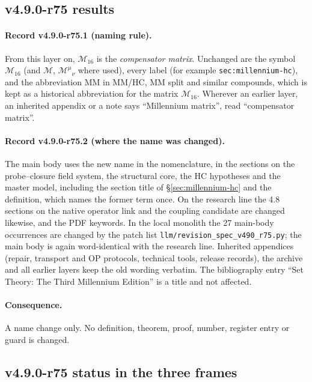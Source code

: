 \subsection*{v4.9.0-r75 results}
\label{subsec:v490-r75-results}

\paragraph{Record v4.9.0-r75.1 (naming rule).}
From this layer on, \(\mathcal M_{16}\) is the \emph{compensator matrix}.  Unchanged are the symbol \(\mathcal M_{16}\) (and
\(\mathcal M\), \(\mathcal M^\mu{}_\nu\) where used), every label (for example \texttt{sec:millennium-hc}), and the
abbreviation MM in MM/HC, MM split and similar compounds, which is kept as a historical abbreviation for the matrix
\(\mathcal M_{16}\).  Wherever an earlier layer, an inherited appendix or a note says ``Millennium matrix'', read
``compensator matrix''.

\paragraph{Record v4.9.0-r75.2 (where the name was changed).}
The main body uses the new name in the nomenclature, in the sections on the probe--closure field system, the structural core,
the HC hypotheses and the master model, including the section title of \S\ref{sec:millennium-hc} and the definition, which
names the former term once.  On the research line the 4.8 sections on the native operator link and the coupling candidate are
changed likewise, and the PDF keywords.  In the local monolith the 27 main-body occurrences are changed by the patch list
\texttt{llm/revision\_spec\_\allowbreak v490\_\allowbreak r75.py}; the main body is again word-identical with the research
line.  Inherited appendices (repair, transport and OP protocols, technical tools, release records), the archive and all earlier
layers keep the old wording verbatim.  The bibliography entry ``Set Theory: The Third Millennium Edition'' is a title and not
affected.

\paragraph{Consequence.}
A name change only.  No definition, theorem, proof, number, register entry or guard is changed.

\subsection*{v4.9.0-r75 status in the three frames}
\label{subsec:v490-r75-frames}

